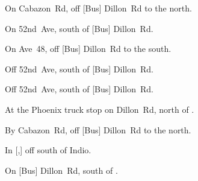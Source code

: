 

\begin{LocationList}

On Cabazon~Rd, off [Bus] Dillon~Rd to the north.

On 52nd~Ave, south of [Bus] Dillon~Rd.

On Ave~48, off [Bus] Dillon~Rd to the south.

Off 52nd~Ave, south of [Bus] Dillon~Rd.

Off 52nd~Ave, south of [Bus] Dillon~Rd.

At the Phoenix truck stop on Dillon~Rd, north of .

By Cabazon~Rd, off [Bus] Dillon~Rd to the north.

In [,] off  south of Indio.

\Location{\TruckStop \Gas \Rest \Service \Weigh}
On [Bus] Dillon~Rd, south of .

\end{LocationList}
